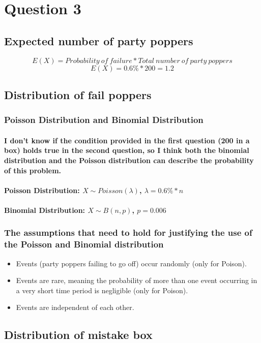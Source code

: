 \section{Question 3}
\subsection{Expected number of party poppers}
$$ E(X)=Probability\ of\ failure * Total\ number\ of\ party\ poppers $$
$$ E(X)=0.6\% *200=1.2 $$
% 
\subsection{Distribution of fail poppers}
\subsubsection{Poisson Distribution and Binomial Distribution}
\paragraph{I don't know if the condition provided in the first question (200 in a box) holds true in the second question, so I think both the binomial distribution and the Poisson distribution can describe the probability of this problem.}
% 
\paragraph{\textbf{Poisson Distribution: }$X \sim Poisson(\lambda)$,
    $\lambda=0.6\%*n$}
\paragraph{\textbf{Binomial Distribution: }$X \sim B(n,p)$, $p=0.006$}
% 
% 
\subsubsection{The assumptions that need to hold for justifying the use of the Poisson and Binomial distribution}
\begin{itemize}
    \item Events (party poppers failing to go off) occur randomly (only for Poison).
    \item Events are rare, meaning the probability of more than one event occurring in a very short time period is negligible (only for Poison).
    \item Events are independent of each other.
\end{itemize}
% 
% 
% 
\subsection{Distribution of mistake box}
